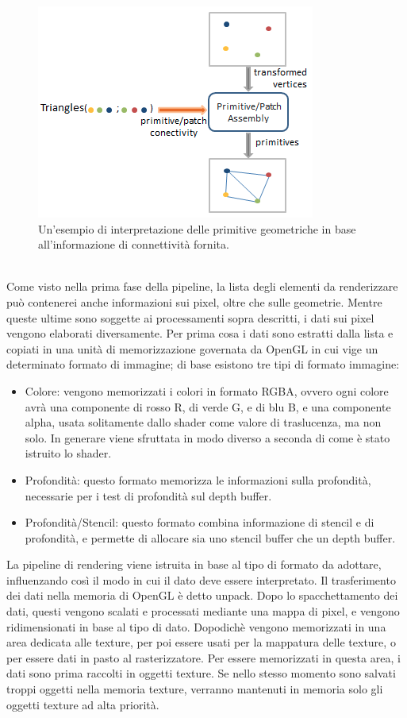 \begin{figure}[htb]
 \centering
 \includegraphics[width=0.5\linewidth]{images/chapter_stato_arte/stato_arte_prim_ass.png}\hfill
 \caption[Primitive Assembly]{Un'esempio di interpretazione delle primitive geometriche in base all'informazione di connettività fornita.}
 \label{fig:stato_arte_prim_ass}
\end{figure}
\\
Come visto nella prima fase della pipeline, la lista degli elementi da renderizzare può contenerei anche informazioni sui pixel, oltre che sulle geometrie. Mentre queste ultime sono soggette ai processamenti sopra descritti, i dati sui pixel vengono elaborati diversamente.
Per prima cosa i dati sono estratti dalla lista e copiati in una unità di memorizzazione governata da OpenGL in cui vige un determinato formato di immagine; di base esistono tre tipi di formato immagine:
\begin{itemize}
\item Colore: vengono memorizzati i colori in formato RGBA, ovvero ogni colore avrà una componente di rosso R, di verde G, e di blu B, e una componente alpha, usata solitamente dallo shader come valore di traslucenza, ma non solo. In generare viene sfruttata in modo diverso a seconda di come è stato istruito lo shader.
\item Profondità: questo formato memorizza le informazioni sulla profondità, necessarie  per i test di profondità sul depth buffer.
\item Profondità/Stencil: questo formato combina informazione di stencil e di profondità, e permette di allocare sia uno stencil buffer che un depth buffer.
\end{itemize}
La pipeline di rendering viene istruita in base al tipo di formato da adottare, influenzando così il modo in cui il dato deve essere interpretato.
Il trasferimento dei dati nella memoria di OpenGL è detto unpack.
Dopo lo spacchettamento dei dati, questi vengono scalati e processati mediante una mappa di pixel, e vengono ridimensionati in base al tipo di dato. Dopodichè vengono memorizzati in una area dedicata alle texture, per poi essere usati per la mappatura delle texture, o per essere dati in pasto al rasterizzatore. 
Per essere memorizzati in questa area, i dati sono prima raccolti in oggetti texture. Se nello stesso momento sono salvati troppi oggetti nella memoria texture, verranno mantenuti in memoria solo  gli oggetti texture ad alta priorità. 

